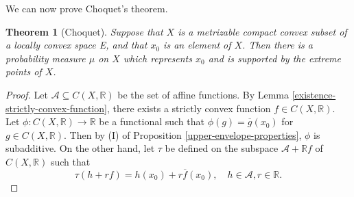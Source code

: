 \documentclass[12pt,a4paper]{amsart}
\newtheorem{theorem}{Theorem}
\theoremstyle{definition}
\begin{document}
	We can now prove Choquet's theorem.
	\begin{theorem}[Choquet]\label{choquet-theorem}
		Suppose that $X$ is a metrizable compact convex subset of a locally convex space E, and that $x_0$ is an element of $X$. Then there is a probability measure $\mu$ on $X$ which represents $x_0$ and is supported by the extreme points of $X$.
	\end{theorem}
	\begin{proof}
		Let $\mathcal{A} \subseteq C(X, \mathbb{R})$ be the set of affine functions.   By Lemma \ref{existence-strictly-convex-function}, there exists a strictly convex function $f \in C(X, \mathbb{R})$. Let $\phi :C(X, \mathbb{R}) \rightarrow \mathbb{R}$ be a functional such that $\phi(g) = \overline{g}(x_0)$ for $g \in C(X, \mathbb{R})$. Then by (I) of Proposition \ref{upper-envelope-properties}, $\phi$ is subadditive. On the other hand, let $\tau$ be defined on the subspace $\mathcal{A} + \mathbb{R}f$ of $C(X, \mathbb{R})$ such that 
		\[  \tau(h +r f) = h(x_0) + r \overline{f}(x_0), \quad h \in \mathcal{A}, r \in \mathbb{R}.  \]
		

\end{proof}
\end{document}
